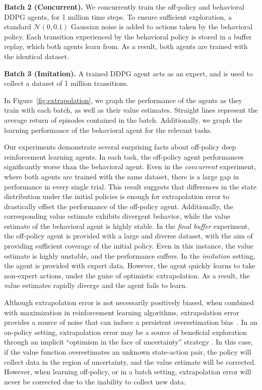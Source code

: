 \documentclass{article}
\newcommand{\N}{\mathcal{N}}
\begin{document}
\textbf{Batch 2 (Concurrent).} We concurrently train the off-policy and behavioral DDPG agents, for 1 million time steps. To ensure sufficient exploration, a standard $\N(0,0.1)$ Gaussian noise is added to actions taken by the behavioral policy. 
Each transition experienced by the behavioral policy 
is stored in a buffer replay, which both agents learn from. As a result, both agents are trained with the identical dataset. 

\textbf{Batch 3 (Imitation).} A trained DDPG agent acts as an expert, and is used to collect a dataset of 1 million transitions.%

In Figure~\ref{fig:extrapolation}, we graph the performance of the agents as they train with each batch, as well as their value estimates. Straight lines represent the average return of episodes contained in the batch. Additionally, we graph the learning performance of the behavioral agent for the relevant tasks. 

Our experiments demonstrate several surprising facts about off-policy deep reinforcement learning agents. In each task, the off-policy agent performances significantly worse than the behavioral agent. Even in the \textit{concurrent} experiment, where both agents are trained with the same dataset, there is a large gap in performance in every single trial. This result suggests that differences in the state distribution under the initial policies is enough for extrapolation error to drastically offset the performance of the off-policy agent. Additionally, the corresponding value estimate exhibits divergent behavior, while the value estimate of the behavioral agent is highly stable. In the \textit{final buffer} experiment, the off-policy agent is provided with a large and diverse dataset, with the aim of providing sufficient coverage of the initial policy. Even in this instance, the value estimate is highly unstable, and the performance suffers. In the \textit{imitation} setting, the agent is provided with expert data. However, the agent quickly learns to take non-expert actions, under the guise of optimistic extrapolation. As a result, the value estimates rapidly diverge and the agent fails to learn. %

Although extrapolation error is not necessarily positively biased, when combined with maximization in reinforcement learning algorithms, extrapolation error provides a source of noise that can induce a persistent overestimation bias~\cite{thrun1993bias,DoubleDQN,fujimoto2018addressing}. In an on-policy setting, extrapolation error may be a source of beneficial exploration through an implicit ``optimism in the face of uncertainty'' strategy \cite{lai1985asymptotically, jaksch2010near}. In this case, if the value function overestimates an unknown state-action pair, the policy will collect data in the region of uncertainty, and the value estimate will be corrected. However, when learning off-policy, or in a batch setting, extrapolation error will never be corrected due to the inability to collect new data. 
\end{document}
